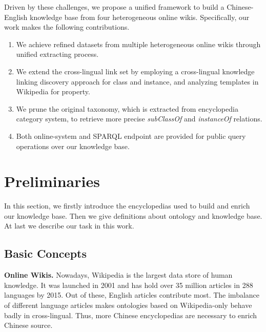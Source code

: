 \documentclass[runningheads,a4paper]{llncs}
\newcommand{\para}[1]{\vspace{0.1cm}\noindent\textbf{#1}}
\begin{document}
\begin{CJK*}{UTF8}{song}
Driven by these challenges, we propose a unified framework to build a Chinese-English knowledge base from four heterogeneous online wikis. Specifically, our work makes the following contributions.
\begin{enumerate}
  \item We achieve refined datasets from multiple heterogeneous online wikis through unified extracting process.
  \item We extend the cross-lingual link set by employing a cross-lingual knowledge linking discovery approach for class and instance, and analyzing templates in Wikipedia for property.
  \item We prune the original taxonomy, which is extracted from encyclopedia category system, to retrieve more precise \textit{subClassOf} and \textit{instanceOf} relations.%
  \item Both online-system and SPARQL endpoint are provided for public query operations over our knowledge base.
\end{enumerate}


\section{Preliminaries}
\label{sec:pd}
In this section, we firstly introduce the encyclopedias used to build and enrich our knowledge base. Then we give definitions about ontology and knowledge base. At last we describe our task in this work.

\subsection{Basic Concepts}
\para{Online Wikis.} Nowadays, Wikipedia is the largest data store of human knowledge. It was launched in 2001 and has hold over 35 million articles in 288 languages by 2015. Out of these, English articles contribute most. The imbalance of different language articles makes ontologies based on Wikipedia-only behave badly in cross-lingual. Thus, more Chinese encyclopedias are necessary to enrich Chinese source.


\end{CJK*}
\end{document}
